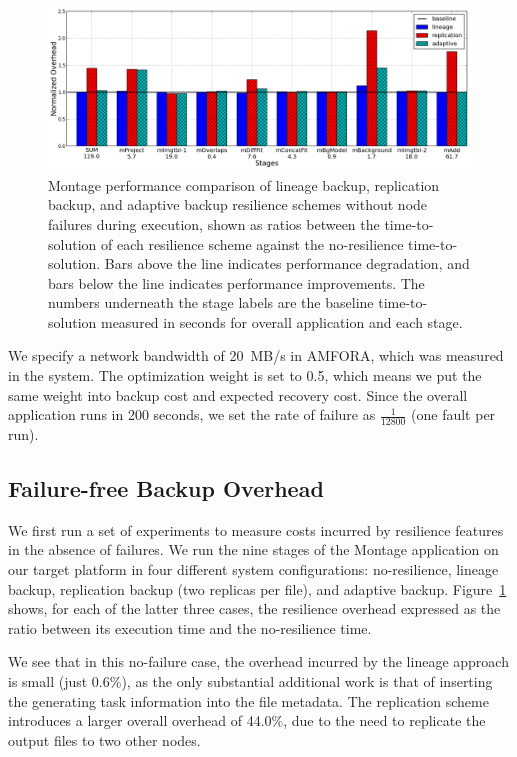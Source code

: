 \documentclass{sig-alternate}
\begin{document}
\begin{figure}[ht]
	\begin{center}
		\includegraphics[width=160mm]{pictures/no-failure.png}
		\vspace{-10pt}
		\caption{Montage performance comparison of lineage backup, replication backup, and adaptive backup
		resilience schemes without node failures during execution, shown as ratios between the time-to-solution 
		of each resilience scheme against the no-resilience time-to-solution. Bars above the line indicates performance degradation,
		and bars below the line indicates performance improvements. The numbers underneath the stage labels are the baseline time-to-solution measured in seconds for overall application and each stage.
		\label{fig:montage}}
  	\end{center}
\end{figure}

We specify a network bandwidth of 20~MB/s in AMFORA, which was measured in the system. The optimization weight is set to 0.5, which means we put the same weight into backup cost and expected recovery cost. Since the overall application runs in 200 seconds, we set the rate of failure as $\frac{1}{12800}$ (one fault per run).


\subsection{Failure-free Backup Overhead}
We first run a set of experiments to measure costs incurred by resilience features in the absence of failures.
We run the nine stages
of the Montage application on our target platform in four different system configurations: no-resilience, lineage backup,
replication backup (two replicas per file), and adaptive backup.
Figure~\ref{fig:montage} shows, for each of the latter three cases, the resilience overhead expressed as
the ratio between its execution time and the no-resilience time.

We see that in this no-failure case, the overhead incurred by the lineage approach is small (just 0.6\%),
as the only substantial additional work is that of inserting the generating task information into the file metadata.
The replication scheme introduces a larger overall overhead of 44.0\%, due to the need to replicate the output files
to two other nodes.
\end{document}
